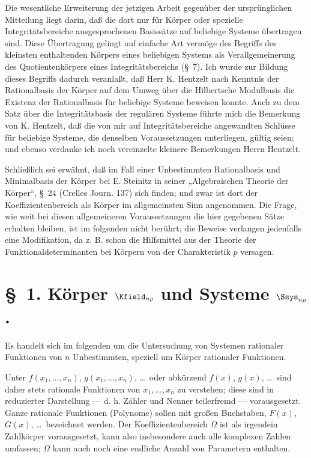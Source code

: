 \documentclass[11pt]{article}
\begin{document}
Die wesentliche Erweiterung der jetzigen Arbeit gegenüber der ursprünglichen Mitteilung liegt darin, daß die dort nur für Körper oder spezielle Integritätsbereiche ausgesprochenen Basissätze auf beliebige Systeme übertragen sind. Diese Übertragung gelingt auf einfache Art vermöge des Begriffs des kleinsten enthaltenden Körpers eines beliebigen Systems als Verallgemeinerung des Quotientenkörpers eines Integritätsbereichs (\S\ 7). Ich wurde zur Bildung dieses Begriffs dadurch veranlaßt, daß Herr K. Hentzelt nach Kenntnis der Rationalbasis der Körper auf dem Umweg über die Hilbertsche Modulbasis die Existenz der Rationalbasis für beliebige Systeme beweisen konnte. Auch zu dem Satz über die Integritätsbasis der regulären Systeme führte mich die Bemerkung von K. Hentzelt, daß die von mir auf Integritätsbereiche angewandten Schlüsse für beliebige Systeme, die denselben Voraussetzungen unterliegen, gültig seien; und ebenso verdanke ich noch vereinzelte kleinere Bemerkungen Herrn Hentzelt.

Schließlich sei erwähnt, daß im Fall einer Unbestimmten Rationalbasis und Minimalbasis der Körper bei E. Steinitz in seiner „Algebraischen Theorie der Körper“, \S\ 24 (Crelles Journ. 137) sich finden; und zwar ist dort der Koeffizientenbereich als Körper im allgemeinsten Sinn angenommen. Die Frage, wie weit bei diesen allgemeineren Voraussetzungen die hier gegebenen Sätze erhalten bleiben, ist im folgenden nicht berührt; die Beweise verlangen jedenfalls eine Modifikation, da z. B. schon die Hilfsmittel aus der Theorie der Funktionaldeterminanten bei Körpern von der Charakteristik $p$ versagen.

\section*{\S\ 1. Körper $\Kfield_{n\rho}$ und Systeme $\Ssys_{n\rho}$.}

Es handelt sich im folgenden um die Untersuchung von Systemen rationaler Funktionen von $n$ Unbestimmten, speziell um Körper rationaler Funktionen.

Unter $f(x_1,\ldots,x_n)$, $g(x_1,\ldots,x_n)$, \ldots\ oder abkürzend $f(x)$, $g(x)$, \ldots\ sind daher stets rationale Funktionen von $x_1,\ldots,x_n$ zu verstehen; diese sind in reduzierter Darstellung --- d. h. Zähler und Nenner teilerfremd --- vorausgesetzt. Ganze rationale Funktionen (Polynome) sollen mit großen Buchstaben, $F(x)$, $G(x)$, \ldots\ bezeichnet werden. Der Koeffizientenbereich $\Omega$ ist als irgendein Zahlkörper vorausgesetzt, kann also insbesondere auch alle komplexen Zahlen umfassen; $\Omega$ kann auch noch eine endliche Anzahl von Parametern enthalten.
\end{document}
